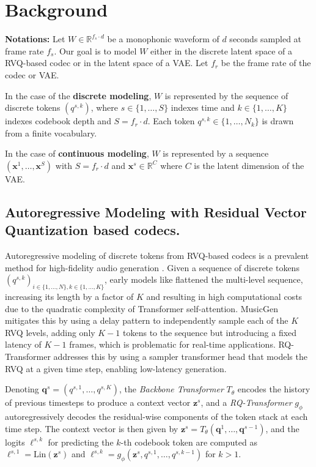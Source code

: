 
\section{Background}
\textbf{Notations:} Let $W \in \mathbb{R}^{f_s \cdot d}$ be a monophonic waveform of $d$ seconds sampled at frame rate $f_s$. Our goal is to model $W$ either in the discrete latent space of a RVQ-based codec or in the latent space of a VAE. Let $f_r$ be the frame rate of the codec or VAE. 

In the case of the \textbf{discrete modeling}, $W$ is represented by the sequence of discrete tokens $\left(q^{s, k} \right)$, where \( s \in \{1, \ldots, S\} \) indexes time and \( k \in \{1, \ldots, K\} \) indexes codebook depth and $S=f_r \cdot d$. Each token \( q^{s,k} \in \{1, \ldots, N_k\} \) is drawn from a finite vocabulary.

In the case of \textbf{continuous modeling}, $W$ is represented by a sequence $\left( \mathbf{x}^1, \ldots, \mathbf{x}^S\right)$ with $S=f_r \cdot d$ and $\mathbf{x}^s \in \mathbb{R}^C$ where $C$ is the latent dimension of the VAE. 

\subsection{Autoregressive Modeling with Residual Vector Quantization based codecs.}

Autoregressive modeling of discrete tokens from RVQ-based codecs \citep{soundstream, encodec} is a prevalent method for high-fidelity audio generation \citep{musicgen, musiclm, audiolm, audiogen}. Given a sequence of discrete tokens $\left(q^{s, k} \right)_{i \in \{1, \ldots, N\}, k \in \{1, \ldots, K\}}$, early models like \citet{audiolm, musiclm} flattened the multi-level sequence, increasing its length by a factor of $K$ and resulting in high computational costs due to the quadratic complexity of Transformer self-attention. MusicGen \citep{musicgen} mitigates this by using a delay pattern to independently sample each of the $K$ RVQ levels, adding only $K-1$ tokens to the sequence but introducing a fixed latency of $K-1$ frames, which is problematic for real-time applications. RQ-Transformer \citep{rq_transformer} addresses this by using a sampler transformer head that models the RVQ at a given time step, enabling low-latency generation.

Denoting $\mathbf{q}^s = (q^{s,1}, \ldots, q^{s,K})$, the \textit{Backbone Transformer} $T_\theta$ encodes the history of previous timesteps to produce a context vector $\mathbf{z}^s$, and a \textit{RQ-Transformer} $g_{\phi}$ autoregressively decodes the residual-wise components of the token stack at each time step. The context vector is then given by $\mathbf{z}^s = T_\theta(\mathbf{q}^1, \ldots, \mathbf{q}^{s-1})$,
and the logits $\ell^{s,k}$ for predicting the \( k \)-th codebook token are computed as $\ell^{s,1} = \text{Lin}(\mathbf{z}^s)$ and $\ell^{s,k} = g_{\phi}\left(\mathbf{z}^s, q^{s,1}, \ldots, q^{s,k-1}\right)$ for $k > 1$.

